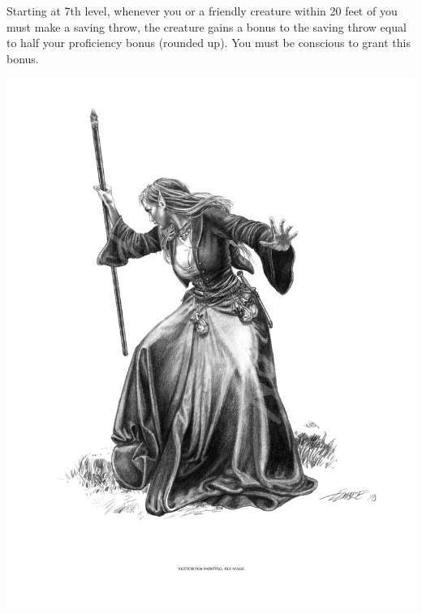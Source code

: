 \begin{multicols*}{2}
Starting at 7th level, whenever you or a friendly creature within 20 feet of you must make a saving throw, the creature gains a bonus to the saving throw equal to half your proficiency bonus (rounded up). You must be conscious to grant this bonus.


\begin{Figure}
\centering
\includegraphics[width=\textwidth]{img/mender.png}
\end{Figure}



    
\end{multicols*}

\clearpage






    